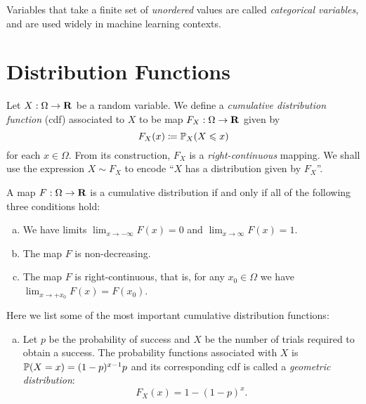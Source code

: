 \begin{definition}
\label{def:categorical-variables}
Variables that take a finite set of \emph{unordered} values are called
\emph{categorical variables}, and are used widely in machine learning contexts.
\end{definition}

\section{Distribution Functions}

\begin{definition}
\label{def:cumulative-distribution-function}
Let \(X: \Omega \to \mathbf{R}\) be a random variable. We define a \emph{cumulative distribution
  function} (cdf) associated to \(X\) to be map \(F_X: \Omega \to \mathbf{R}\) given by
\[
F_X(x) \coloneq \operatorname{\mathbb{P}}_X(X \leqslant x)
\]
for each \(x \in \Omega\). From its construction, \(F_X\) is a
\emph{right-continuous} mapping. We shall use the expression \(X \sim F_X\) to
encode ``\(X\) has a distribution given by \(F_X\)''.
\end{definition}

\begin{theorem}
\label{thm:cdf-iff-properties}
A map \(F: \Omega \to \mathbf{R}\) is a cumulative distribution if and only if all of
the following three conditions hold:
\begin{enumerate}[(a)]\setlength\itemsep{0em}
\item We have limits \(\lim_{x \to -\infty} F(x) = 0\) and \(\lim_{x \to \infty} F(x) = 1\).
\item The map \(F\) is non-decreasing.
\item The map \(F\) is right-continuous, that is, for any \(x_0 \in \Omega\) we
  have \(\lim_{x \to +x_0} F(x) = F(x_0)\).
\end{enumerate}
\end{theorem}

\begin{example}
\label{exp:cdfs}
Here we list some of the most important cumulative distribution functions:
\begin{enumerate}[(a)]\setlength\itemsep{0em}
\item Let \(p\) be the probability of success and \(X\) be the number of trials
  required to obtain a success. The probability functions associated with \(X\)
  is \(\operatorname{\mathbb{P}}(X = x) = (1 - p)^{x-1} p\) and its corresponding cdf is called a
  \emph{geometric distribution}:
  \[
  F_X(x) = 1 - (1 - p)^x.
  \]

\end{enumerate}
\end{example}


